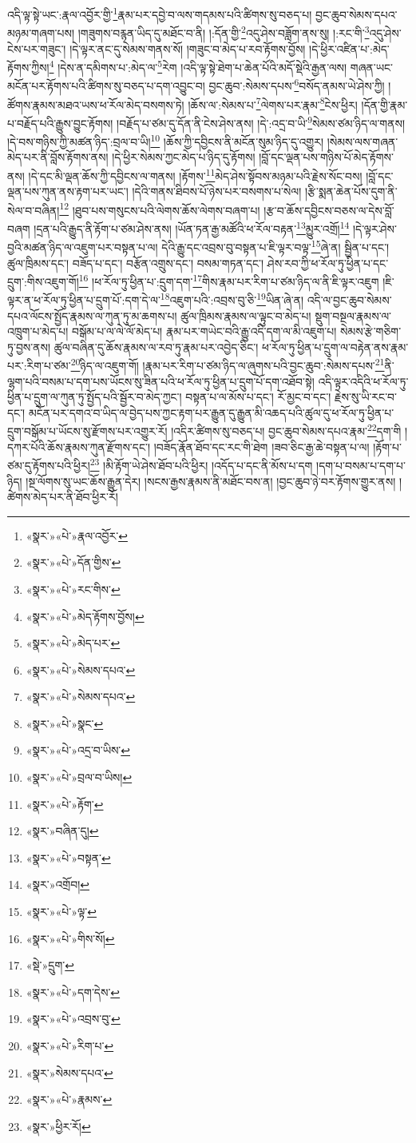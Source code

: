 འདི་ལྟ་སྟེ་ཡང་:རྣལ་འབྱོར་གྱི་\footnote{«སྣར་»«པེ་»རྣལ་འབྱོར་}རྣམ་པར་དབྱེ་བ་ལས་གདམས་པའི་ཚིགས་སུ་བཅད་པ། བྱང་ཆུབ་སེམས་དཔའ་མཉམ་གཞག་པས། །གཟུགས་བརྙན་ཡིད་དུ་མཐོང་བ་ནི། །:དོན་གྱི་\footnote{«སྣར་»«པེ་»དོན་གྱིས་}འདུ་ཤེས་བཟློག་ནས་སུ། །:རང་གི་\footnote{«སྣར་»«པེ་»རང་གིས་}འདུ་ཤེས་ངེས་པར་གཟུང་། །དེ་ལྟར་ནང་དུ་སེམས་གནས་སོ། །གཟུང་བ་མེད་པ་རབ་རྟོགས་བྱོས། །དེ་ཕྱིར་འཛིན་པ་:མེད་རྟོགས་ཀྱིས།\footnote{«སྣར་»«པེ་»མེད་རྟོགས་བྱོས།} །དེས་ན་དམིགས་པ་:མེད་ལ་\footnote{«སྣར་»«པེ་»མེད་པར་}རེག །འདི་ལྟ་སྟེ་ཐེག་པ་ཆེན་པོའི་མདོ་སྡེའི་རྒྱན་ལས། གཞན་ཡང་མངོན་པར་རྟོགས་པའི་ཚིགས་སུ་བཅད་པ་དག་འབྱུང་བ། བྱང་ཆུབ་:སེམས་དཔས་\footnote{«སྣར་»«པེ་»སེམས་དཔའ་}བསོད་ནམས་ཡེ་ཤེས་ཀྱི། །ཚོགས་རྣམས་མཐའ་ཡས་ཕ་རོལ་མེད་བསགས་ཏེ། །ཆོས་ལ་:སེམས་པ་\footnote{«སྣར་»«པེ་»སེམས་དཔའ་}ལེགས་པར་རྣམ་\footnote{«སྣར་»«པེ་»སྣང་}ངེས་ཕྱིར། །དོན་གྱི་རྣམ་པ་བརྗོད་པའི་རྒྱུས་བྱུང་རྟོགས། །བརྗོད་པ་ཙམ་དུ་དོན་ནི་ངེས་ཤེས་ནས། །དེ་:འདྲ་བ་ཡི་\footnote{«སྣར་»«པེ་»འདྲ་བ་ཡིས་}སེམས་ཙམ་ཉིད་ལ་གནས། །དེ་བས་གཉིས་ཀྱི་མཚན་ཉིད་:བྲལ་བ་ཡི།\footnote{«སྣར་»«པེ་»བྲལ་བ་ཡིས།} །ཆོས་ཀྱི་དབྱིངས་ནི་མངོན་སུམ་ཉིད་དུ་འགྱུར། །སེམས་ལས་གཞན་མེད་པར་ནི་བློས་རྟོགས་ནས། །དེ་ཕྱིར་སེམས་ཀྱང་མེད་པ་ཉིད་དུ་རྟོགས། །བློ་དང་ལྡན་པས་གཉིས་པོ་མེད་རྟོགས་ནས། །དེ་དང་མི་ལྡན་ཆོས་ཀྱི་དབྱིངས་ལ་གནས། །རྟོགས་\footnote{«སྣར་»«པེ་»རྟོག་}མེད་ཤེས་སྟོབས་མཉམ་པའི་རྗེས་སོང་བས། །བློ་དང་ལྡན་པས་ཀུན་ནས་རྟག་པར་ཡང་། །དེའི་གནས་ཐིབས་པོ་ཉེས་པར་བསགས་པ་སེལ། །རྩི་སྨན་ཆེན་པོས་དུག་ནི་སེལ་བ་བཞིན།\footnote{«སྣར་»བཞིན་དུ།} །ཐུབ་པས་གསུངས་པའི་ལེགས་ཆོས་ལེགས་བཞག་པ། །རྩ་བ་ཆོས་དབྱིངས་བཅས་ལ་དེས་བློ་བཞག །དྲན་པའི་རྒྱུད་ནི་རྟོག་པ་ཙམ་ཤེས་ནས། །ཡོན་ཏན་རྒྱ་མཚོའི་ཕ་རོལ་བརྟན་\footnote{«སྣར་»«པེ་»བསྟན་}མྱུར་འགྲོ།\footnote{«སྣར་»འགྲོབ།} །དེ་ལྟར་ཤེས་བྱའི་མཚན་ཉིད་ལ་འཇུག་པར་བསྟན་པ་ལ། དེའི་རྒྱུ་དང་འབྲས་བུ་བསྟན་པ་ཇི་ལྟར་བལྟ་\footnote{«སྣར་»«པེ་»ལྟ་}ཞེ་ན། སྦྱིན་པ་དང་། ཚུལ་ཁྲིམས་དང་། བཟོད་པ་དང་། བརྩོན་འགྲུས་དང་། བསམ་གཏན་དང་། ཤེས་རབ་ཀྱི་ཕ་རོལ་ཏུ་ཕྱིན་པ་དང་དྲུག་:གིས་འཇུག་གོ།\footnote{«སྣར་»«པེ་»གིས་སོ།} །ཕ་རོལ་ཏུ་ཕྱིན་པ་:དྲུག་དག་\footnote{«སྡེ་»དྲུག་}གིས་རྣམ་པར་རིག་པ་ཙམ་ཉིད་ལ་ནི་ཇི་ལྟར་འཇུག །ཇི་ལྟར་ན་ཕ་རོལ་ཏུ་ཕྱིན་པ་དྲུག་པོ་:དག་དེ་ལ་\footnote{«སྣར་»«པེ་»དག་དེས་}འཇུག་པའི་:འབྲས་བུ་ཅི་\footnote{«སྣར་»«པེ་»འབྲས་བུ་}ཡིན་ཞེ་ན། འདི་ལ་བྱང་ཆུབ་སེམས་དཔའ་ལོངས་སྤྱོད་རྣམས་ལ་ཀུན་ཏུ་མ་ཆགས་པ། ཚུལ་ཁྲིམས་རྣམས་ལ་ལྟུང་བ་མེད་པ། སྡུག་བསྔལ་རྣམས་ལ་འཁྲུག་པ་མེད་པ། བསྒོམ་པ་ལ་ལེ་ལོ་མེད་པ། རྣམ་པར་གཡེང་བའི་རྒྱུ་འདི་དག་ལ་མི་འཇུག་པ། སེམས་རྩེ་གཅིག་ཏུ་བྱས་ནས། ཚུལ་བཞིན་དུ་ཆོས་རྣམས་ལ་རབ་ཏུ་རྣམ་པར་འབྱེད་ཅིང་། ཕ་རོལ་ཏུ་ཕྱིན་པ་དྲུག་ལ་བརྟེན་ནས་རྣམ་པར་:རིག་པ་ཙམ་\footnote{«སྣར་»«པེ་»རིག་པ་}ཉིད་ལ་འཇུག་གོ། །རྣམ་པར་རིག་པ་ཙམ་ཉིད་ལ་ཞུགས་པའི་བྱང་ཆུབ་:སེམས་དཔས་\footnote{«སྣར་»སེམས་དཔའ་}ནི་ལྷག་པའི་བསམ་པ་དག་པས་ཡོངས་སུ་ཟིན་པའི་ཕ་རོལ་ཏུ་ཕྱིན་པ་དྲུག་པོ་དག་འཐོབ་སྟེ། འདི་ལྟར་འདིའི་ཕ་རོལ་ཏུ་ཕྱིན་པ་དྲུག་ལ་ཀུན་ཏུ་སྤྱོད་པའི་སྦྱོར་བ་མེད་ཀྱང་། བསྟན་པ་ལ་མོས་པ་དང་། རོ་མྱང་བ་དང་། རྗེས་སུ་ཡི་རང་བ་དང་། མངོན་པར་དགའ་བ་ཡིད་ལ་བྱེད་པས་ཀྱང་རྟག་པར་རྒྱུན་དུ་རྒྱུན་མི་འཆད་པའི་ཚུལ་དུ་ཕ་རོལ་ཏུ་ཕྱིན་པ་དྲུག་བསྒོམ་པ་ཡོངས་སུ་རྫོགས་པར་འགྱུར་རོ། །འདིར་ཚིགས་སུ་བཅད་པ། བྱང་ཆུབ་སེམས་དཔའ་རྣམ་\footnote{«སྣར་»«པེ་»རྣམས་}དག་གི །དཀར་པོའི་ཆོས་རྣམས་ཀུན་རྫོགས་དང་། །བཟོད་རྣོན་ཐོབ་དང་རང་གི་ཐེག །ཟབ་ཅིང་རྒྱ་ཆེ་བསྟན་པ་ལ། །རྟོག་པ་ཙམ་དུ་རྟོགས་པའི་ཕྱིར།\footnote{«སྣར་»ཕྱིར་རོ།} །མི་རྟོག་ཡེ་ཤེས་ཐོབ་པའི་ཕྱིར། །འདོད་པ་དང་ནི་མོས་པ་དག །དག་པ་བསམ་པ་དག་པ་ཉིད། །སྔ་ལོགས་སུ་ཡང་ཆོས་རྒྱུན་དེར། །སངས་རྒྱས་རྣམས་ནི་མཐོང་བས་ན། །བྱང་ཆུབ་ཉེ་བར་རྟོགས་གྱུར་ནས། །ཚེགས་མེད་པར་ནི་ཐོབ་ཕྱིར་རོ། 